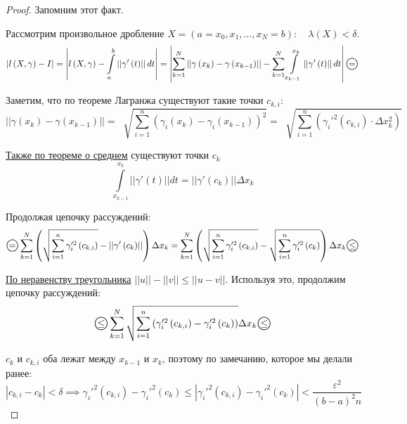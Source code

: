 \documentclass[../main.tex]{subfiles}
\begin{document}
\begin{proof}
    Запомним этот факт. 

    Рассмотрим произвольное дробление \( X=(a=x_0, x_1, \ldots , x_N=b):\quad \lambda \left( X\right)< \delta \). 
    \[ \left| l \left( X, \gamma \right)- I\right|=\left| l \left( X, \gamma \right)- \displaystyle\int\limits_{ a}^{ b} \left| \left| \gamma '\left( t\right)\right|\right|dt\right|=\left| \sum\limits_{ k=1}^{ N} \left| \left| \gamma \left( x_k\right)- \gamma \left( x_{k-1}\right)\right|\right|- \sum\limits_{ k=1}^{ N} \displaystyle\int\limits_{ x_{k-1}}^{ x_k} \left| \left| \gamma '\left( t\right)\right|\right|dt\right|\oeq\]

    Заметим, что по теореме Лагранжа существуют такие точки \( c_{k,i}\):
    \[ \left| \left| \gamma \left( x_k\right)- \gamma \left( x_{k-1}\right)\right|\right|= \;\sqrt[]{ \sum\limits_{ i=1}^{ n} \left( \gamma _i\left( x_k\right)- \gamma _i\left( x_{k-1}\right)\right)^2}= \;\sqrt[]{ \sum\limits_{ i=1}^{ n} \left( \gamma _i'^2 \left( c_{k,i}\right) \cdot \Delta x_k^2\right)}\]

    \hyperlink{thm:simple_average}{Также по теореме о среднем} существуют точки \( c_k\)
    \[ \displaystyle\int\limits_{ x_{k-1}}^{ x_k} \left| \left| \gamma '\left( t\right)\right|\right|dt=\left| \left| \gamma '\left( c_k\right)\right|\right| \Delta x_k\]

    Продолжая цепочку рассуждений:
    \begin{equation*}
        \begin{aligned}
            \oeq \sum\limits_{ k=1}^{ N} \left( \;\sqrt[]{ \sum\limits_{ i=1}^{ n} \gamma _i'^2\left( c_{k,i}\right)}-\left| \left| \gamma '\left( c_k\right)\right|\right|\right) \Delta x_k = \sum\limits_{ k=1}^{ N} \left( \;\sqrt[]{ \sum\limits_{ i=1}^{ n} \gamma _i'^2\left( c_{k,i}\right)}- \;\sqrt[]{ \sum\limits_{ i=1}^{ n} \gamma _i'^2\left( c_k\right)}\right) \Delta x_k \oleq
        \end{aligned}
    \end{equation*}

    \hyperlink{thm:minkovsky}{По неравенству треугольника} \( \left| \left| u\right|\right|-\left| \left| v\right|\right| \leq \left| \left| u-v\right|\right|\). Используя это, продолжим цепочку рассуждений: 
    \[ \oleq \sum\limits_{ k=1}^{ N} \;\sqrt[]{ \sum\limits_{ i=1}^{ n} \left( \gamma _i'^2\left( c_{k,i}\right)- \gamma _i'^2\left( c_k\right)\right)} \Delta x_k \oleq\]

    \( c_k\) и \( c_{k, i}\) оба лежат между \( x_{k-1}\) и \( x_k\), поэтому по замечанию, которое мы делали ранее:
    \[ \left| c_{k,i}-c_k\right| < \delta \implies \gamma _i'^2\left( c_{k,i}\right)- \gamma _i'^2\left( c_k\right) \leq \left|\gamma _i'^2\left( c_{k,i}\right)- \gamma _i'^2\left( c_k\right) \right| < \dfrac{ \varepsilon^2}{ \left( b-a\right)^2n} \]


\end{proof}
\end{document}
